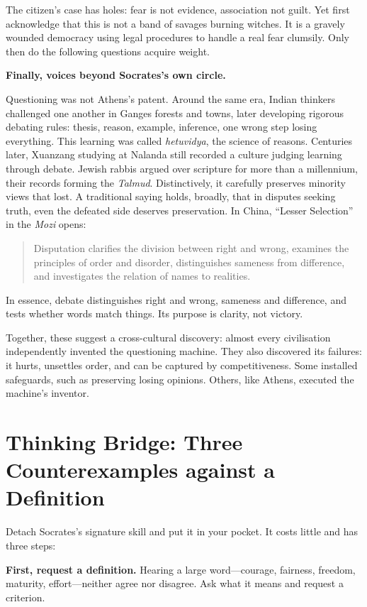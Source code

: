 The citizen's case has holes: fear is not evidence, association not guilt. Yet first acknowledge that this is not a band of savages burning witches. It is a gravely wounded democracy using legal procedures to handle a real fear clumsily. Only then do the following questions acquire weight.

\textbf{Finally, voices beyond Socrates's own circle.}

Questioning was not Athens's patent. Around the same era, Indian thinkers challenged one another in Ganges forests and towns, later developing rigorous debating rules: thesis, reason, example, inference, one wrong step losing everything. This learning was called \textit{hetuvidya}, the science of reasons. Centuries later, Xuanzang studying at Nalanda still recorded a culture judging learning through debate. Jewish rabbis argued over scripture for more than a millennium, their records forming the \textit{Talmud}. Distinctively, it carefully preserves minority views that lost. A traditional saying holds, broadly, that in disputes seeking truth, even the defeated side deserves preservation. In China, ``Lesser Selection'' in the \textit{Mozi} opens:

\begin{quote}
Disputation clarifies the division between right and wrong, examines the principles of order and disorder, distinguishes sameness from difference, and investigates the relation of names to realities.
\end{quote}
In essence, debate distinguishes right and wrong, sameness and difference, and tests whether words match things. Its purpose is clarity, not victory.

Together, these suggest a cross-cultural discovery: almost every civilisation independently invented the questioning machine. They also discovered its failures: it hurts, unsettles order, and can be captured by competitiveness. Some installed safeguards, such as preserving losing opinions. Others, like Athens, executed the machine's inventor.

\section[Thinking Bridge: Test a Definition]{Thinking Bridge: Three Counterexamples against a Definition}
Detach Socrates's signature skill and put it in your pocket. It costs little and has three steps:

\textbf{First, request a definition.} Hearing a large word---courage, fairness, freedom, maturity, effort---neither agree nor disagree. Ask what it means and request a criterion.

